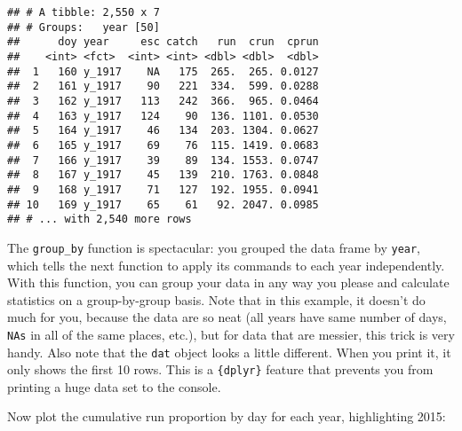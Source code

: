 \documentclass[]{book}
\newenvironment{Shaded}{\begin{snugshade}}{\end{snugshade}}
\newcommand{\KeywordTok}[1]{\textcolor[rgb]{0.13,0.29,0.53}{\textbf{#1}}}
\newcommand{\DataTypeTok}[1]{\textcolor[rgb]{0.13,0.29,0.53}{#1}}
\newcommand{\DecValTok}[1]{\textcolor[rgb]{0.00,0.00,0.81}{#1}}
\newcommand{\StringTok}[1]{\textcolor[rgb]{0.31,0.60,0.02}{#1}}
\newcommand{\CommentTok}[1]{\textcolor[rgb]{0.56,0.35,0.01}{\textit{#1}}}
\newcommand{\ControlFlowTok}[1]{\textcolor[rgb]{0.13,0.29,0.53}{\textbf{#1}}}
\newcommand{\OperatorTok}[1]{\textcolor[rgb]{0.81,0.36,0.00}{\textbf{#1}}}
\newcommand{\NormalTok}[1]{#1}
\theoremstyle{definition}
\theoremstyle{definition}
\theoremstyle{definition}
\theoremstyle{remark}
\begin{document}
\begin{verbatim}
## # A tibble: 2,550 x 7
## # Groups:   year [50]
##      doy year     esc catch   run  crun  cprun
##    <int> <fct>  <int> <int> <dbl> <dbl>  <dbl>
##  1   160 y_1917    NA   175  265.  265. 0.0127
##  2   161 y_1917    90   221  334.  599. 0.0288
##  3   162 y_1917   113   242  366.  965. 0.0464
##  4   163 y_1917   124    90  136. 1101. 0.0530
##  5   164 y_1917    46   134  203. 1304. 0.0627
##  6   165 y_1917    69    76  115. 1419. 0.0683
##  7   166 y_1917    39    89  134. 1553. 0.0747
##  8   167 y_1917    45   139  210. 1763. 0.0848
##  9   168 y_1917    71   127  192. 1955. 0.0941
## 10   169 y_1917    65    61   92. 2047. 0.0985
## # ... with 2,540 more rows
\end{verbatim}

The \texttt{group\_by} function is spectacular: you grouped the data
frame by \texttt{year}, which tells the next function to apply its
commands to each year independently. With this function, you can group
your data in any way you please and calculate statistics on a
group-by-group basis. Note that in this example, it doesn't do much for
you, because the data are so neat (all years have same number of days,
\texttt{NAs} in all of the same places, etc.), but for data that are
messier, this trick is very handy. Also note that the \texttt{dat}
object looks a little different. When you print it, it only shows the
first 10 rows. This is a \texttt{\{dplyr\}} feature that prevents you
from printing a huge data set to the console.

Now plot the cumulative run proportion by day for each year,
highlighting 2015:

\begin{Shaded}
\end{Shaded}
\end{document}
